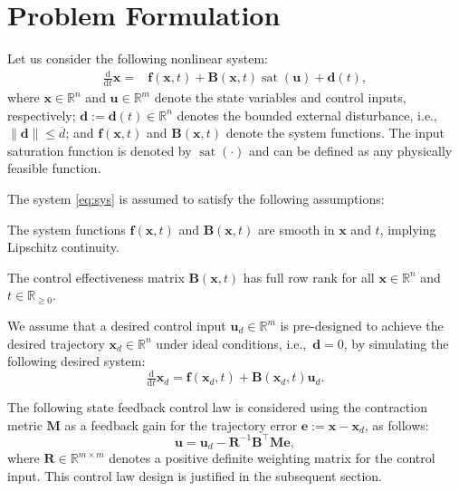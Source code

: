 \documentclass{ifacconf}
\newcommand\ie{\textrm{i.e.,\ }}
\newcommand\R{\mathbb{R}}
\newcommand*{\mv}[1]{\boldsymbol{#1}} %
\newcommand*{\mm}[1]{\boldsymbol{#1}} %
\newcommand*{\norm}[1]{\lVert #1 \rVert} %
\DeclareMathOperator{\mysat}{{sat}}       %
\newcommand\der{\mathrm d}
\newcommand*{\ddtt}{
   \tfrac{\der}{\der t}
}
\begin{document}
\section{Problem Formulation} \label{sec:problem}

Let us consider the following nonlinear system:
\begin{equation} \label{eq:sys}
   \begin{aligned}   
      \ddtt{\mv{x}}
      =&
      \mv{f}(\mv{x},t)
      +
      \mm{B}(\mv{x},t)
      \mysat(\mv{u})   
      +
      \mv{d}(t)
      ,
   \end{aligned}
\end{equation}
where $\mv{x}\in\R^n$ and $\mv{u}\in\R^m$ denote the state variables and control inputs, respectively; $\mv{d}:=\mv{d}(t)\in\R^n$ denotes the bounded external disturbance, \ie $\norm{\mv{d}} \leq \overline{d}$; and $\mv{f}(\mv{x},t)$ and $\mm{B}(\mv{x},t)$ denote the system functions.
The input saturation function is denoted by $\mysat(\cdot)$ and can be defined as any physically feasible function.

The system \eqref{eq:sys} is assumed to satisfy the following assumptions:

\begin{assum} \label{assum:sys:smooth}
   The system functions $\mv{f}(\mv{x},t)$ and $\mm{B}(\mv{x},t)$ are smooth in $\mv{x}$ and $t$, implying Lipschitz continuity.
\end{assum}

\begin{assum}[Full row rank of $\mm{B}$] \label{assum:sys:B}
   The control effectiveness matrix $\mm{B}(\mv{x},t)$ has full row rank for all $\mv{x}\in\R^n$ and $t\in\R_{\geq 0}$.
\end{assum}


We assume that a desired control input $\mv{u}_d\in\R^m$ is pre-designed to achieve the desired trajectory $\mv{x}_d\in\R^n$ under ideal conditions, \ie $\mv{d}=0$, by simulating the following desired system:
\begin{equation} \label{eq:sys:desired}
   \ddtt\mv{x}_d   =
   \mv{f}(\mv{x}_d, t)   
   +
   \mm{B}(\mv{x}_d,t) \mv{u}_d
   .
\end{equation}

The following state feedback control law is considered using the contraction metric $\mm{M}$ as a feedback gain for the trajectory error $\mv{e}:=\mv{x}-\mv{x}_d$, as follows:
\begin{equation} \label{eq:control:law}
   \mv{u}
   =
   \mv{u}_d
   -
   \mm{R}^{-1} \mm{B}^\top \mm{M}
   \mv{e}
   ,
\end{equation}
where $\mm{R}\in\R^{m\times m}$ denotes a positive definite weighting matrix for the control input.
This control law design is justified in the subsequent section.
\end{document}
